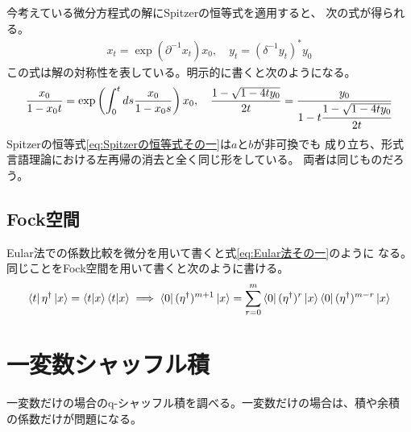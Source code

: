 {	今考えている微分方程式の解にSpitzerの恒等式を適用すると、
	次の式が得られる。
	\begin{equation*}\begin{split}
		x_t = \exp(\partial^{-1}x_t)x_0,\quad y_t = (\delta^{-1}y_t)^*y_0
	\end{split}\end{equation*}
	この式は解の対称性を表している。明示的に書くと次のようになる。
	\begin{equation*}\begin{split}
		\frac{x_0}{1-x_0t} = \exp\left(\int_0^tds\frac{x_0}{1-x_0s}\right)x_0
		,\quad \frac{1 - \sqrt{1 - 4ty_0}}{2t} 
		= \frac{y_0}{1 - t\cfrac{1 - \sqrt{1 - 4ty_0}}{2t}}
	\end{split}\end{equation*}
	Spitzerの恒等式\eqref{eq:Spitzerの恒等式その一}は$a$と$b$が非可換でも
	成り立ち、形式言語理論における左再帰の消去と全く同じ形をしている。
	両者は同じものだろう。
\subsection{Fock空間}\label{s2:Fock空間} %
	Eular法での係数比較を微分を用いて書くと式\eqref{eq:Eular法その一}のように
	なる。同じことをFock空間を用いて書くと次のように書ける。
	\begin{equation*}\begin{split}
		\mathinner{\langle{t}|}\eta^\dag\mathinner{|{x}\rangle} = \mathinner{\langle{t|x}\rangle}\mathinner{\langle{t|x}\rangle}
		\implies \mathinner{\langle{0}|}(\eta^\dag)^{m+1}\mathinner{|{x}\rangle} = \sum_{r=0}^m
			\mathinner{\langle{0}|}(\eta^\dag)^r\mathinner{|{x}\rangle}\mathinner{\langle{0}|}(\eta^\dag)^{m-r}\mathinner{|{x}\rangle}
	\end{split}\end{equation*}
\section{一変数シャッフル積}\label{s1:一変数シャッフル積} %
	一変数だけの場合のq-シャッフル積を調べる。一変数だけの場合は、積や余積
	の係数だけが問題になる。

}
